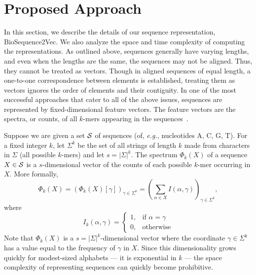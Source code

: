 \documentclass[runningheads]{llncs}
\newcommand{\eg}{\emph{e.g.}}
\begin{document}
\section{Proposed Approach}\label{sec_ourSol}  
In this section, we describe the details of our sequence
representation, BioSequence2Vec. We also analyze the space and time
complexity of computing the representations. As outlined above,
sequences generally have varying lengths, and even when the lengths
are the same, the sequences may not be aligned. Thus, they cannot be
treated as vectors. Though in aligned sequences of equal length, a
one-to-one correspondence between elements is established, treating
them as vectors ignores the order of elements and their contiguity. In
one of the most successful approaches that cater to all of the above
issues, sequences are represented by fixed-dimensional feature
vectors. The feature vectors are the spectra, or counts, of all
$k$-mers appearing in the
sequences~\cite{ali2021spike2vec}.

Suppose we are given a set ${\cal S}$ of sequences (of, \eg,
nucleotides A, C, G, T). For a fixed integer $k$, let $\Sigma^k$ be the
set of all strings of length $k$ made from characters in $\Sigma$ (all
possible $k$-mers) and let $s=|\Sigma|^k$. The spectrum $\Phi_k(X)$ of
a sequence $X\in {\cal S}$ is a $s$-dimensional vector of the counts
of each possible $k$-mer occurring in $X$.  More formally,
\begin{equation}\label{defspectrum}
  \Phi_{k}(X) =  \left( \Phi_{k}(X)[\gamma]\right)_{\gamma \in \Sigma^k} 
=     \left( \sum_{\alpha \in X} I(\alpha,\gamma)\right)_{\gamma \in \Sigma^k},
\end{equation}
where 
\begin{equation}
    I_k (\alpha,\gamma) = 
    \begin{cases}
    1,& \text{if } \alpha = \gamma  \\
    0,              & \text{otherwise}
    \end{cases}
\end{equation}
Note that $\Phi_{k} (X)$ is a $s=\vert \Sigma \vert^k$-dimensional
vector where the coordinate $\gamma \in \Sigma^k$ has a value equal to
the frequency of $\gamma$ in $X$. Since this dimensionality grows
quickly for modest-sized alphabets --- it is exponential in $k$ ---
the space complexity of representing sequences can quickly become
prohibitive.
\end{document}
